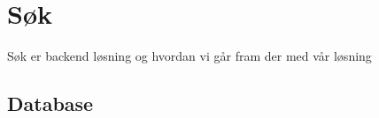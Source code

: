 \section{Søk}
Søk er backend løsning og hvordan vi går fram der med  vår løsning
\subsection{Database}